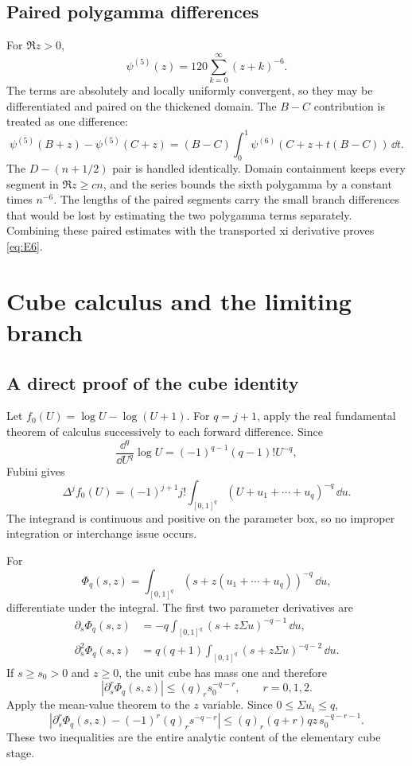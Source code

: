 \subsection{Paired polygamma differences}

For $\Re z>0$,
\[
 \psi^{(5)}(z)=120\sum_{k=0}^\infty(z+k)^{-6}.
\]
The terms are absolutely and locally uniformly convergent, so they may be
differentiated and paired on the thickened domain.  The $B-C$ contribution
is treated as one difference:
\[
 \psi^{(5)}(B+z)-\psi^{(5)}(C+z)
 =(B-C)\int_0^1\psi^{(6)}(C+z+t(B-C))\,\dd t.
\]
The $D-(n+1/2)$ pair is handled identically.  Domain containment keeps every
segment in $\Re z\ge cn$, and the series bounds the sixth polygamma by a
constant times $n^{-6}$.  The lengths of the paired segments carry the
small branch differences that would be lost by estimating the two
polygamma terms separately.  Combining these paired estimates with the
transported xi derivative proves \eqref{eq:E6}.

\section{Cube calculus and the limiting branch}\label{app:cube-branch}

\subsection{A direct proof of the cube identity}

Let $f_0(U)=\log U-\log(U+1)$.  For $q=j+1$, apply the real fundamental
theorem of calculus successively to each forward difference.  Since
\[
 \frac{\dd^q}{\dd U^q}\log U=(-1)^{q-1}(q-1)!U^{-q},
\]
Fubini gives
\[
 \Delta^jf_0(U)=(-1)^{j+1}j!
 \int_{[0,1]^q}(U+u_1+\cdots+u_q)^{-q}\,\dd u.
\]
The integrand is continuous and positive on the parameter box, so no
improper integration or interchange issue occurs.

For
\[
 \Phi_q(s,z)=\int_{[0,1]^q}
 (s+z(u_1+\cdots+u_q))^{-q}\,\dd u,
\]
differentiate under the integral.  The first two parameter derivatives are
\begin{align*}
 \partial_s\Phi_q(s,z)
 &=-q\int_{[0,1]^q}(s+z\Sigma u)^{-q-1}\,\dd u,\\
 \partial_s^2\Phi_q(s,z)
 &=q(q+1)\int_{[0,1]^q}(s+z\Sigma u)^{-q-2}\,\dd u.
\end{align*}
If $s\ge s_0>0$ and $z\ge0$, the unit cube has mass one and therefore
\begin{equation}\label{app:Phi-bounds}
 |\partial_s^r\Phi_q(s,z)|\le(q)_rs_0^{-q-r},
 \qquad r=0,1,2.
\end{equation}
Apply the mean-value theorem to the $z$ variable.  Since
$0\le\Sigma u_i\le q$,
\begin{equation}\label{app:Phi-comparison}
 \left|\partial_s^r\Phi_q(s,z)-(-1)^r(q)_rs^{-q-r}\right|
 \le(q)_r(q+r)qz\,s_0^{-q-r-1}.
\end{equation}
These two inequalities are the entire analytic content of the elementary
cube stage.

